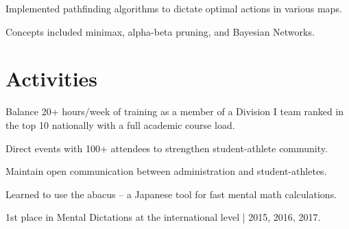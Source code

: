 \documentclass[]{deedy-resume-openfont}
\begin{document}
\begin{minipage}[t]{0.66\textwidth}
\begin{tightemize}
    \item Implemented pathfinding algorithms to dictate optimal actions in various maps.
    \item Concepts included minimax, alpha-beta pruning, and Bayesian Networks.
\end{tightemize}
\sectionsep



\section{Activities} 
\begin{tightemize}
    \item Balance 20+ hours/week of training as a member of a Division I team ranked in the top 10 nationally with a full academic course load.
\end{tightemize}
\sectionsep

\begin{tightemize}
    \item Direct events with 100+ attendees to strengthen student-athlete community.
    \item Maintain open communication between administration and student-athletes.
\end{tightemize}
\sectionsep

\descript{}
\begin{tightemize}
    \item Learned to use the abacus – a Japanese tool for fast mental math calculations. 
    \item 1st place in Mental Dictations at the international level | 2015, 2016, 2017.
\end{tightemize}

\end{minipage} 
\end{document}
